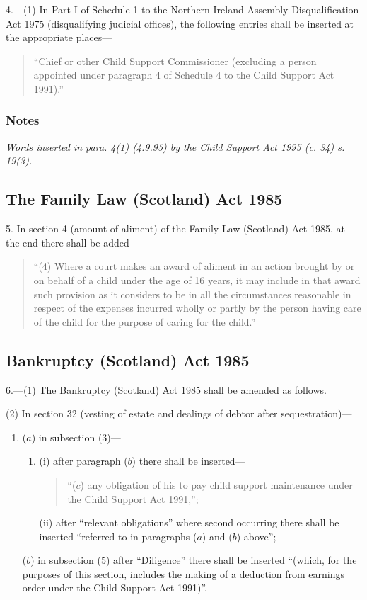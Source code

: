 \documentclass[a4paper]{article}
\newcommand\amendment[1]{\subsubsection*{Notes}{\itshape\frenchspacing\footnotesize #1 \par}}
\begin{document}
4.---(1) In Part I of Schedule 1 to the Northern Ireland Assembly Disqualification Act 1975 (disqualifying judicial offices), the following entries shall be inserted at the appropriate places---
\begin{quotation}
 “Chief or other Child Support Commissioner (excluding a person appointed under paragraph 4 of Schedule 4 to the Child Support Act 1991).''
\end{quotation}

\amendment{
Words inserted in para. 4(1) (4.9.95) by the Child Support Act 1995 (c. 34) s. 19(3).
}

\subsection*{The Family Law (Scotland) Act 1985}

5. In section 4 (amount of aliment) of the Family Law (Scotland) Act 1985, at the end there shall be added—
\begin{quotation}
“(4) Where a court makes an award of aliment in an action brought by or on behalf of a child under the age of 16 years, it may include in that award such provision as it considers to be in all the circumstances reasonable in respect of the expenses incurred wholly or partly by the person having care of the child for the purpose of caring for the child.”
\end{quotation}

\subsection*{Bankruptcy (Scotland) Act 1985}

6.---(1) The Bankruptcy (Scotland) Act 1985 shall be amended as follows.

\begin{sloppypar}
(2) In section 32 (vesting of estate and dealings of debtor after se\-ques\-tra\-tion)---
\end{sloppypar}
\begin{enumerate}\item[]
($a$) in subsection (3)---
\begin{enumerate}\item[]
(i) after paragraph ($b$) there shall be inserted—
\begin{quotation}
“($c$) any obligation of his to pay child support maintenance under the Child Support Act 1991,”;
\end{quotation}

(ii) after “relevant obligations” where second occurring there shall be inserted “referred to in paragraphs ($a$) and ($b$) above”;
\end{enumerate}

($b$) in subsection (5) after “Diligence” there shall be inserted “(which, for the purposes of this section, includes the making of a deduction from earnings order under the Child Support Act 1991)”.
\end{enumerate}
\end{document}
